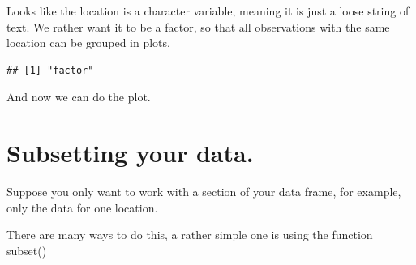 \documentclass[
]{book}
\newenvironment{Shaded}{\begin{snugshade}}{\end{snugshade}}
\newcommand{\AttributeTok}[1]{\textcolor[rgb]{0.77,0.63,0.00}{#1}}
\newcommand{\FunctionTok}[1]{\textcolor[rgb]{0.00,0.00,0.00}{#1}}
\newcommand{\NormalTok}[1]{#1}
\newcommand{\OtherTok}[1]{\textcolor[rgb]{0.56,0.35,0.01}{#1}}
\newcommand{\SpecialCharTok}[1]{\textcolor[rgb]{0.00,0.00,0.00}{#1}}
\newcommand{\StringTok}[1]{\textcolor[rgb]{0.31,0.60,0.02}{#1}}
\begin{document}
Looks like the location is a character variable, meaning it is just a loose string of text. We rather want it to be a factor, so that all observations with the same location can be grouped in plots.

\begin{Shaded}
\end{Shaded}

\begin{verbatim}
## [1] "factor"
\end{verbatim}

And now we can do the plot.

\begin{Shaded}
\end{Shaded}

\hypertarget{subsetting-your-data.}{%
\section{Subsetting your data.}\label{subsetting-your-data.}}

Suppose you only want to work with a section of your data frame, for example, only the data for one location.

There are many ways to do this, a rather simple one is using the function subset()

\begin{Shaded}
\end{Shaded}
\end{document}
